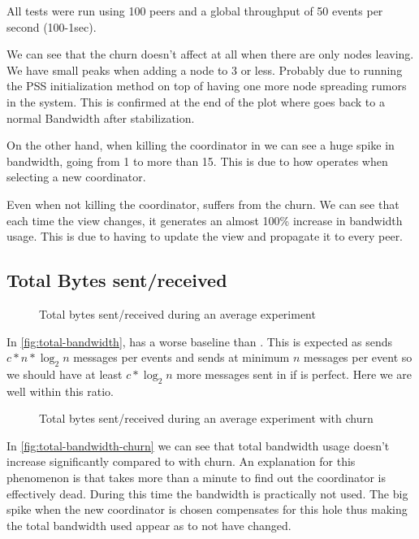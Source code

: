 All tests were run using 100 peers and a global throughput of 50 events per second (100-1sec). 

We can see that the churn doesn't affect  \epto at all when there are only nodes leaving. We have small peaks when adding a node to \SI{3}{\mbps} or less. Probably due to running the PSS initialization method on top of having one more node spreading rumors in the system. This is confirmed at the end of the plot where \epto goes back to a normal Bandwidth after stabilization.

On the other hand, when killing the coordinator in \jgroups we can see a huge spike in bandwidth, going from \SI{1}{\mbps} to more than \SI{15}{\mbps}. This is due to how \jgroups operates when selecting a new coordinator.

Even when not killing the coordinator, \jgroups suffers from the churn. We can see that each time the view changes, it generates an almost 100\% increase in bandwidth usage. This is due to \jgroups having to update the view and propagate it to every peer.

\newpage

\subsection{Total Bytes sent/received}
\begin{figure}[h]
	\centering
	
	\vspace{-2mm} 
	\caption{Total bytes sent/received during an average experiment}
	\vspace{-2mm} 
	\label{fig:total-bandwidth}
\end{figure}
In \autoref{fig:total-bandwidth}, \epto has a worse baseline than \jgroups. This is expected as \epto sends $c*n*\log_2 n$ messages per events and \jgroups sends at minimum $n$ messages per event so we should have at least $c*\log_2 n$ more messages sent in \epto if \jgroups is perfect. Here we are well within this ratio.

\begin{figure}[h]
	\centering
	
	\vspace{-2mm} 
	\caption{Total bytes sent/received during an average experiment with churn}
	\vspace{-2mm} 
	\label{fig:total-bandwidth-churn}
\end{figure}
In \autoref{fig:total-bandwidth-churn} we can see that \jgroups total bandwidth usage doesn't increase significantly compared to \epto with churn. An explanation for this phenomenon is that \jgroups takes more than a minute to find out the coordinator is effectively dead. During this time the bandwidth is practically not used. The big spike when the new coordinator is chosen compensates for this hole thus making the total bandwidth used appear as to not have changed.


